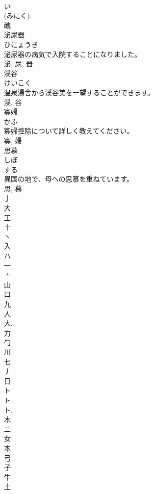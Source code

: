 \documentclass[8pt]{extreport}
\begin{document}
\begin{CJK}{UTF8}{min}
\\	い 
\\	(みにく). 
\\	醜	
\\	泌尿器	
\\	ひにょうき	
\\	泌尿器の病気で入院することになりました。	
\\	泌, 尿, 器	
\\	渓谷	
\\	けいこく	
\\	温泉湯舎から渓谷美を一望することができます。	
\\	渓, 谷	
\\	寡婦	
\\	かふ	
\\	寡婦控除について詳しく教えてください。	
\\	寡, 婦	
\\	思慕	
\\	しぼ	
\\	する 
\\	異国の地で、母への思慕を重ねています。	
\\	思, 慕	
\\	亅	
\\	大	
\\	工	
\\	十	
\\	丶	
\\	入	
\\	ハ	
\\	一	
\\	亠	
\\	山	
\\	口	
\\	九	
\\	人	
\\	大. 
\\	力	
\\	勹	
\\	川	
\\	七	
\\	丿	
\\	日	
\\	ト	
\\	ト 
\\	ト, 
\\	木	
\\	二	
\\	女	
\\	本	
\\	弓	
\\	子	
\\	牛	
\\	土	

\end{CJK}
\end{document}
